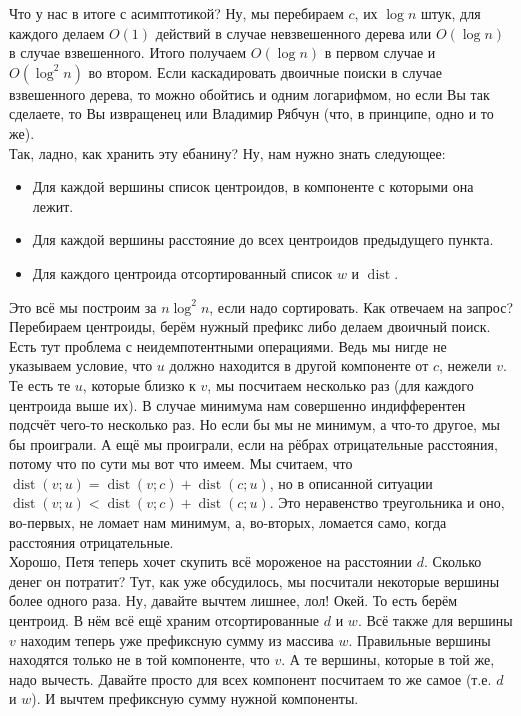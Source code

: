 \documentclass{article}
\begin{document}
    Что у нас в итоге с асимптотикой? Ну, мы перебираем $c$, их $\log n$ штук, для каждого делаем $O(1)$ действий в случае невзвешенного дерева или $O(\log n)$ в случае взвешенного. Итого получаем $O(\log n)$ в первом случае и $O(\log^2n)$ во втором. Если каскадировать двоичные поиски в случае взвешенного дерева, то можно обойтись и одним логарифмом, но если Вы так сделаете, то Вы извращенец или Владимир Рябчун (что, в принципе, одно и то же).\\
    Так, ладно, как хранить эту ебанину? Ну, нам нужно знать следующее:
    \begin{itemize}
        \item Для каждой вершины список центроидов, в компоненте с которыми она лежит.
        \item Для каждой вершины расстояние до всех центроидов предыдущего пункта.
        \item Для каждого центроида отсортированный список $w$ и $\operatorname{dist}$.
    \end{itemize}
    Это всё мы построим за $n\log^2n$, если надо сортировать. Как отвечаем на запрос? Перебираем центроиды, берём нужный префикс либо делаем двоичный поиск.\\
    Есть тут проблема с неидемпотентными операциями. Ведь мы нигде не указываем условие, что $u$ должно находится в другой компоненте от $c$, нежели $v$. Те есть те $u$, которые близко к $v$, мы посчитаем несколько раз (для каждого центроида выше их). В случае минимума нам совершенно индифферентен подсчёт чего-то несколько раз. Но если бы мы не минимум, а что-то другое, мы бы проиграли. А ещё мы проиграли, если на рёбрах отрицательные расстояния, потому что по сути мы вот что имеем. Мы считаем, что $\operatorname{dist}(v;u)=\operatorname{dist}(v;c)+\operatorname{dist}(c;u)$, но в описанной ситуации $\operatorname{dist}(v;u)<\operatorname{dist}(v;c)+\operatorname{dist}(c;u)$. Это неравенство треугольника и оно, во-первых, не ломает нам минимум, а, во-вторых, ломается само, когда расстояния отрицательные.\\
    Хорошо, Петя теперь хочет скупить всё мороженое на расстоянии $d$. Сколько денег он потратит? Тут, как уже обсудилось, мы посчитали некоторые вершины более одного раза. Ну, давайте вычтем лишнее, лол! Окей. То есть берём центроид. В нём всё ещё храним отсортированные $d$ и $w$. Всё также для вершины $v$ находим теперь уже префиксную сумму из массива $w$. Правильные вершины находятся только не в той компоненте, что $v$. А те вершины, которые в той же, надо вычесть. Давайте просто для всех компонент посчитаем то же самое (т.е. $d$ и $w$). И вычтем префиксную сумму нужной компоненты.\\
\end{document}
